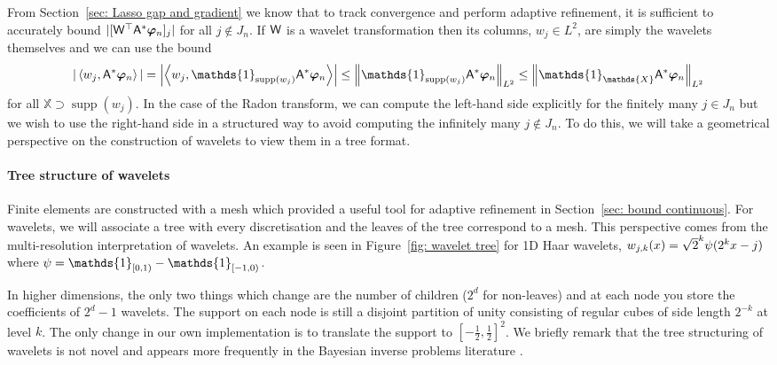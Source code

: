 \documentclass[smallextended]{svjour3}
\let\F\mathds\let\C\mathcal\newcommand{\R}{\F{R}}\newcommand{\A}{\tens{A}}
\newcommand{\norm}[1]{{\left\lVert #1 \right\rVert}}
\newcommand{\IP}[2]{\left\langle #1,#2 \right\rangle}
\newcommand{\1}{\F{1}}
\DeclareMathOperator{\supp}{supp}
\newcommand*{\vard}[1]{%
	\IfEqCase{#1}{%
		{0}{\varphi}%
		{1}{\psi}%
	}[\varphi #1]%
}
\newcommand*{\varx}[1]{%
	\IfEqCase{#1}{%
		{0}{x}%
		{1}{y}%
		{2}{z}%
		{3}{r}%
	}[x#1]%
}
\newcommand*{\vvard}[1]{\vec{\vard{#1}}}
\begin{document}
	From Section~\ref{sec: Lasso gap and gradient} we know that to track convergence and perform adaptive refinement, it is sufficient to accurately bound $|[\tens{W}^\top \A^*\vvard0_n]_j|$ for all $j\notin J_n$. If $\mathsf{W}$ is a wavelet transformation then its columns, $w_j\in L^2$, are simply the wavelets themselves and we can use the bound 
	\begin{equation}
		|\IP{w_j}{\A^*\vvard0_n}| = \left|\IP{w_j}{\1_{\supp(w_j)}\A^*\vvard0_n}\right| \leq \norm{\1_{\supp(w_j)} \A^*\vvard0_n}_{L^2}\leq \norm{\1_{\F{X}} \A^*\vvard0_n}_{L^2}
	\end{equation}
	for all $\F{X}\supset \supp(w_j)$.
	In the case of the Radon transform, we can compute the left-hand side explicitly for the finitely many $j\in J_n$ but we wish to use the right-hand side in a structured way to avoid computing the infinitely many $j\notin J_n$. To do this, we will take a geometrical perspective on the construction of wavelets to view them in a tree format. 
	
	\paragraph{Tree structure of wavelets}
	Finite elements are constructed with a mesh which provided a useful tool for adaptive refinement in Section~\ref{sec: bound continuous}. For wavelets, we will associate a tree with every discretisation and the leaves of the tree correspond to a mesh. This perspective comes from the multi-resolution interpretation of wavelets. An example is seen in Figure~\ref{fig: wavelet tree} for 1D Haar wavelets, $w_{j,k}(\varx0) = \sqrt{2}^k\vard1(2^{k}\varx0-j)$ where $\vard1 = \1_{[0,1)} - \1_{[-1,0)}$. 
	
	In higher dimensions, the only two things which change are the number of children ($2^d$ for non-leaves) and at each node you store the coefficients of $2^d-1$ wavelets. The support on each node is still a disjoint partition of unity consisting of regular cubes of side length $2^{-k}$ at level $k$. The only change in our own implementation is to translate the support to $[-\tfrac12,\tfrac12]^2$. We briefly remark that the tree structuring of wavelets is not novel and appears more frequently in the Bayesian inverse problems literature \cite{Castillo2019,Kekkonen2021}.
	
\end{document}
